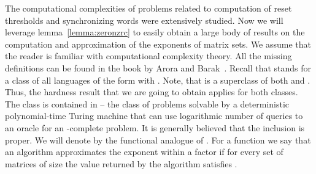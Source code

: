 \documentclass[a4paper,USenglish]{lipics}
\theoremstyle{definition}
\begin{document}
The computational complexities of problems related to computation of reset thresholds and synchronizing words were extensively studied. Now we will leverage lemma~\ref{lemma:zeronzrc} to easily obtain a large body of results on the computation and approximation of the exponents of  matrix sets. We assume that the reader is familiar with computational complexity theory. All the missing definitions can be found in the book by Arora and Barak~\cite{Aro09}. Recall that  stands for a class of all languages of the form  with . Note, that  is a superclass of both  and . Thus, the hardness result that we are going to obtain applies for both classes. The class  is contained in  -- the class of problems solvable by a deterministic polynomial-time Turing machine that can use logarithmic number of queries to an oracle for an -complete problem. It is generally believed that the inclusion is proper. We will denote by  the functional analogue of . For a function  we say that an algorithm approximates the exponent 
within a factor  if for every set  of matrices of size  the value  returned by the algorithm satisfies .
\end{document}
